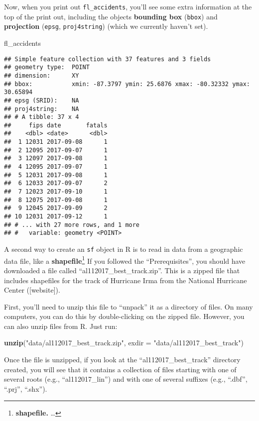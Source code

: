 \documentclass[]{tufte-book}
\newenvironment{Shaded}{}{}
\newcommand{\DataTypeTok}[1]{\textcolor[rgb]{0.56,0.13,0.00}{#1}}
\newcommand{\KeywordTok}[1]{\textcolor[rgb]{0.00,0.44,0.13}{\textbf{#1}}}
\newcommand{\NormalTok}[1]{#1}
\newcommand{\StringTok}[1]{\textcolor[rgb]{0.25,0.44,0.63}{#1}}
\begin{document}
Now, when you print out \texttt{fl\_accidents}, you'll see some extra information at the top of the print
out, including the objects \textbf{bounding box} (\texttt{bbox}) and \textbf{projection} (\texttt{epsg}, \texttt{proj4string})
(which we currently haven't set).

\begin{Shaded}
\begin{Highlighting}[]
\NormalTok{fl_accidents}
\end{Highlighting}
\end{Shaded}

\begin{verbatim}
## Simple feature collection with 37 features and 3 fields
## geometry type:  POINT
## dimension:      XY
## bbox:           xmin: -87.3797 ymin: 25.6876 xmax: -80.32332 ymax: 30.65894
## epsg (SRID):    NA
## proj4string:    NA
## # A tibble: 37 x 4
##     fips date       fatals
##    <dbl> <date>      <dbl>
##  1 12031 2017-09-08      1
##  2 12095 2017-09-07      1
##  3 12097 2017-09-08      1
##  4 12095 2017-09-07      1
##  5 12031 2017-09-08      1
##  6 12033 2017-09-07      2
##  7 12023 2017-09-10      1
##  8 12075 2017-09-08      1
##  9 12045 2017-09-09      2
## 10 12031 2017-09-12      1
## # ... with 27 more rows, and 1 more
## #   variable: geometry <POINT>
\end{verbatim}

A second way to create an \texttt{sf} object in R is to read in data from a geographic data file, like
a \textbf{shapefile}\footnote{\textbf{shapefile.} \ldots{}}
If you followed the ``Prerequisites'', you should have downloaded a file called
``al112017\_best\_track.zip''. This is a zipped file that includes shapefiles for the track of
Hurricane Irma from the National Hurricane Center ({[}website{]}).

First, you'll need to unzip this file to ``unpack'' it as a directory of files. On many
computers, you can do this by double-clicking on the zipped file. However, you can also
unzip files from R. Just run:

\begin{Shaded}
\begin{Highlighting}[]
\KeywordTok{unzip}\NormalTok{(}\StringTok{"data/al112017_best_track.zip"}\NormalTok{, }\DataTypeTok{exdir =} \StringTok{"data/al112017_best_track"}\NormalTok{)}
\end{Highlighting}
\end{Shaded}

Once the file is unzipped, if you look at the ``al112017\_best\_track'' directory created,
you will see that it contains a collection of files starting with one of several roots
(e.g., ``al112017\_lin'') and with one of several suffixes (e.g., ``.dbf'', ``.prj'', ``.shx'').
\end{document}
